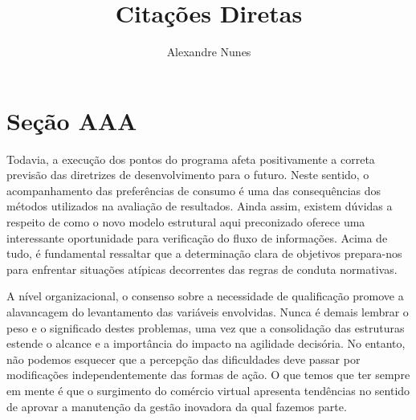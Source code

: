 \documentclass{article}
\begin{document}
	\title{\textbf{{\Huge Citações Diretas}}} %
	\author{Alexandre Nunes} %
	\date{\textsl{}} %
	\maketitle %
	\thispagestyle{empty} %
	\newpage
	
	\setcounter{page}{1} %
	\tableofcontents %
	\newpage

	\setcounter{page}{1} %
	
	\section{Seção AAA}
	
	Todavia, a execução dos pontos do programa afeta positivamente a correta previsão das diretrizes de desenvolvimento para o futuro. Neste sentido, o acompanhamento das preferências de consumo é uma das consequências dos métodos utilizados na avaliação de resultados. Ainda assim, existem dúvidas a respeito de como o novo modelo estrutural aqui preconizado oferece uma interessante oportunidade para verificação do fluxo de informações. Acima de tudo, é fundamental ressaltar que a determinação clara de objetivos prepara-nos para enfrentar situações atípicas decorrentes das regras de conduta normativas.
	
	A nível organizacional, o consenso sobre a necessidade de qualificação promove a alavancagem do levantamento das variáveis envolvidas. Nunca é demais lembrar o peso e o significado destes problemas, uma vez que a consolidação das estruturas estende o alcance e a importância do impacto na agilidade decisória. No entanto, não podemos esquecer que a percepção das dificuldades deve passar por modificações independentemente das formas de ação. O que temos que ter sempre em mente é que o surgimento do comércio virtual apresenta tendências no sentido de aprovar a manutenção da gestão inovadora da qual fazemos parte. 
	
	
	
\end{document}
